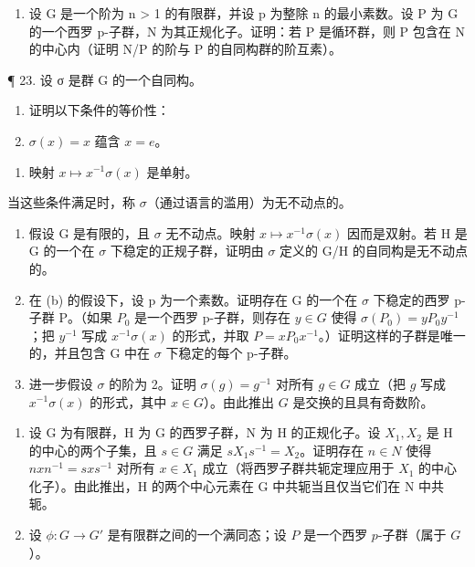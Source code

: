 \begin{enumerate}
\def\labelenumi{\arabic{enumi}。}
\setcounter{enumi}{21}
\tightlist
\item
  设 G 是一个阶为 n \textgreater{} 1 的有限群，并设 p 为整除 n 的最小素数。设 P 为 G 的一个西罗 p-子群，N 为其正规化子。证明：若 P 是循环群，则 P 包含在 N 的中心内（证明 N/P 的阶与 P 的自同构群的阶互素）。
\end{enumerate}

¶ 23. 设 σ 是群 G 的一个自同构。

\begin{enumerate}
\def\labelenumi{(\alph{enumi})}
\item
  证明以下条件的等价性：
\item
  \(\sigma(x) = x\) 蕴含 \(x = e\)。
\end{enumerate}

\begin{enumerate}
\def\labelenumi{(\roman{enumi})}
\setcounter{enumi}{1}
\tightlist
\item
  映射 \(x \mapsto x^{-1}\sigma(x)\) 是单射。
\end{enumerate}

当这些条件满足时，称 \(\sigma\)（通过语言的滥用）为无不动点的。

\begin{enumerate}
\def\labelenumi{(\alph{enumi})}
\setcounter{enumi}{1}
\item
  假设 G 是有限的，且 \(\sigma\) 无不动点。映射 \(x \mapsto x^{-1}\sigma(x)\) 因而是双射。若 H 是 G 的一个在 \(\sigma\) 下稳定的正规子群，证明由 \(\sigma\) 定义的 G/H 的自同构是无不动点的。
\item
  在 (b) 的假设下，设 p 为一个素数。证明存在 G 的一个在 \(\sigma\) 下稳定的西罗 p-子群 P。（如果 \(P_{0}\) 是一个西罗 p-子群，则存在 \(y \in G\) 使得 \(\sigma(P_{0}) = yP_{0}y^{-1}\)；把 \(y^{-1}\) 写成 \(x^{-1}\sigma(x)\) 的形式，并取 \(P = xP_{0}x^{-1}\)。）证明这样的子群是唯一的，并且包含 G 中在 \(\sigma\) 下稳定的每个 p-子群。
\item
  进一步假设 \(\sigma\) 的阶为 2。证明 \(\sigma(g) = g^{-1}\) 对所有 \(g \in G\) 成立（把 \(g\) 写成 \(x^{-1}\sigma(x)\) 的形式，其中 \(x \in G\)）。由此推出 \(G\) 是交换的且具有奇数阶。
\end{enumerate}

\begin{enumerate}
\def\labelenumi{\arabic{enumi}。}
\setcounter{enumi}{23}
\item
  设 G 为有限群，H 为 G 的西罗子群，N 为 H 的正规化子。设 \(X_{1}, X_{2}\) 是 H 的中心的两个子集，且 \(s \in G\) 满足 \(sX_{1}s^{-1} = X_{2}\)。证明存在 \(n \in N\) 使得 \(nxn^{-1} = sxs^{-1}\) 对所有 \(x \in X_{1}\) 成立（将西罗子群共轭定理应用于 \(X_{1}\) 的中心化子）。由此推出，H 的两个中心元素在 G 中共轭当且仅当它们在 N 中共轭。
\item
  设 \(\phi: G \to G'\) 是有限群之间的一个满同态；设 \(P\) 是一个西罗 \(p\)-子群（属于 \(G\)）。
\end{enumerate}

